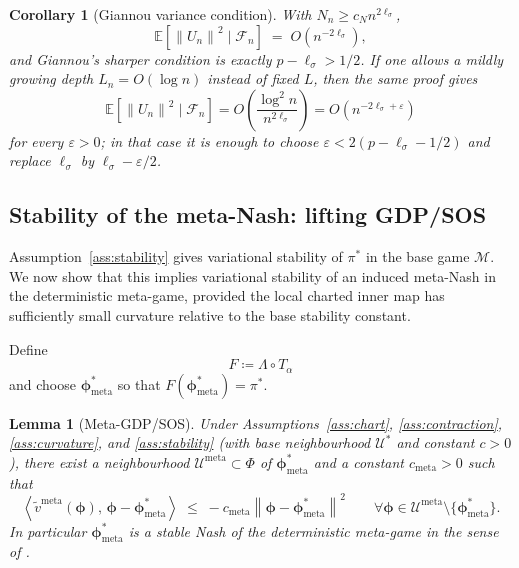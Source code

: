 \documentclass[11pt]{article}
\newtheorem{lemma}[theorem]{Lemma}
\newtheorem{corollary}[theorem]{Corollary}
\theoremstyle{definition}
\newcommand{\E}{\mathbb{E}}
\newcommand{\norm}[1]{\left\lVert #1 \right\rVert}
\newcommand{\inner}[2]{\left\langle #1,\,#2 \right\rangle}
\newcommand{\calF}{\mathcal{F}}
\newcommand{\calM}{\mathcal{M}}
\newcommand{\calU}{\mathcal{U}}
\newcommand{\meta}{\mathrm{meta}}
\begin{document}
\begin{corollary}[Giannou variance condition]\label{cor:variance-rate}
With $N_n\ge c_N n^{2\ell_\sigma}$,
\begin{equation}\label{eq:variance-rate}
\E[\norm{U_n}^2\mid\calF_n]\;=\;O(n^{-2\ell_\sigma}),
\end{equation}
and Giannou's sharper condition is exactly $p-\ell_\sigma>1/2$. If one allows a mildly growing depth $L_n=O(\log n)$ instead of fixed $L$, then the same proof gives
\[
\E[\norm{U_n}^2\mid\calF_n]
=
O\!\left(\frac{\log^2 n}{n^{2\ell_\sigma}}\right)
=
O(n^{-2\ell_\sigma+\varepsilon})
\]
for every $\varepsilon>0$; in that case it is enough to choose $\varepsilon<2(p-\ell_\sigma-1/2)$ and replace $\ell_\sigma$ by $\ell_\sigma-\varepsilon/2$.
\end{corollary}

\subsection{Stability of the meta-Nash: lifting GDP/SOS}

Assumption~\ref{ass:stability} gives variational stability of $\pi^*$ in the base game $\calM$. We now show that this implies variational stability of an induced meta-Nash in the deterministic meta-game, provided the local charted inner map has sufficiently small curvature relative to the base stability constant.

Define
\[
F\coloneqq \Lambda\circ T_\alpha
\]
and choose $\bm\phi^*_\meta$ so that $F(\bm\phi^*_\meta)=\pi^*$.

\begin{lemma}[Meta-GDP/SOS]\label{lem:gdp}
Under Assumptions~\ref{ass:chart}, \ref{ass:contraction}, \ref{ass:curvature}, and \ref{ass:stability} (with base neighbourhood $\calU^*$ and constant $c>0$), there exist a neighbourhood $\calU^\meta\subset\Phi$ of $\bm\phi^*_\meta$ and a constant $c_\meta>0$ such that
\begin{equation}\label{eq:meta-vs}
\inner{\widetilde v^\meta(\bm\phi)}{\bm\phi-\bm\phi^*_\meta}\;\le\;-c_\meta\norm{\bm\phi-\bm\phi^*_\meta}^2
\qquad\forall \bm\phi\in\calU^\meta\setminus\{\bm\phi^*_\meta\}.
\end{equation}
In particular $\bm\phi^*_\meta$ is a stable Nash of the deterministic meta-game in the sense of \cite[Def.~2]{Giannou2022}.
\end{lemma}
\end{document}
